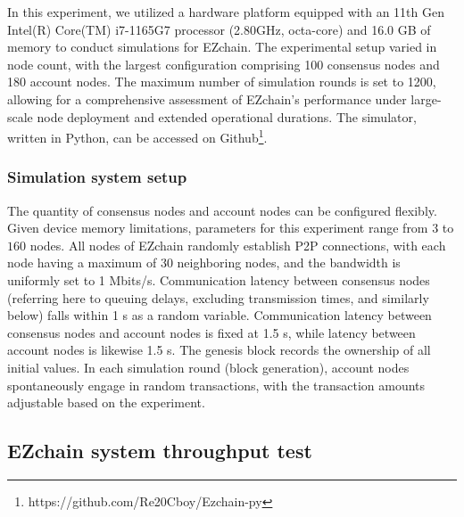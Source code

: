 \documentclass[conference]{IEEEtran}
\begin{document}

In this experiment, we utilized a hardware platform equipped with an 11th Gen Intel(R) Core(TM) i7-1165G7 processor (2.80GHz, octa-core) and 16.0 GB of memory to conduct simulations for EZchain. The experimental setup varied in node count, with the largest configuration comprising 100 consensus nodes and 180 account nodes. The maximum number of simulation rounds is set to 1200, allowing for a comprehensive assessment of EZchain's performance under large-scale node deployment and extended operational durations. The simulator, written in Python, can be accessed on Github\footnote{https://github.com/Re20Cboy/Ezchain-py}.


\subsubsection{Simulation system setup}
\label{subsubsec: Simulation system setup}

The quantity of consensus nodes and account nodes can be configured flexibly. Given device memory limitations, parameters for this experiment range from $3$ to $160$ nodes. All nodes of EZchain randomly establish P2P connections, with each node having a maximum of 30 neighboring nodes, and the bandwidth is uniformly set to 1 Mbits/s.  Communication latency between consensus nodes (referring here to queuing delays, excluding transmission times, and similarly below) falls within 1 s as a random variable. Communication latency between consensus nodes and account nodes is fixed at 1.5 s, while latency between account nodes is likewise 1.5 s. The genesis block records the ownership of all initial values. In each simulation round (block generation), account nodes spontaneously engage in random transactions, with the transaction amounts adjustable based on the experiment.

\subsection{EZchain system throughput test}
\label{subsec: throughput test}
\end{document}
